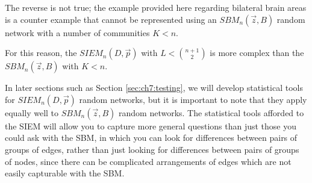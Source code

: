 The reverse is not true; the example provided here regarding bilateral brain areas is a counter example that cannot be represented using an $SBM_n(\vec z, B)$ random network with a number of communities $K < n$.

For this reason, the $SIEM_n(D, \vec p)$ with $L < \binom{n+1}{2}$ is more complex than the $SBM_n(\vec z, B)$ with $K < n$.

In later sections such as Section \ref{sec:ch7:testing}, we will develop statistical tools for $SIEM_n(D, \vec p)$ random networks, but it is important to note that they apply equally well to $SBM_n(\vec z, B)$ random networks. The statistical tools afforded to the SIEM will allow you to capture more general questions than just those you could ask with the SBM, in which you can look for differences between pairs of groups of edges, rather than just looking for differences between pairs of groups of nodes, since there can be complicated arrangements of edges which are not easily capturable with the SBM.


\newpage